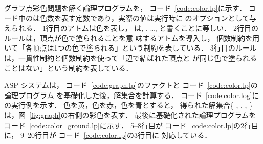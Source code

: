 グラフ点彩色問題を解く論理プログラムを，
コード~\ref{code:color.lp}に示す．
コード中のは色数を表す定数であり，実際の値は実行時に
{\clingo}のオプションとして与えられる．
1行目のアトムは色を表し，
は, , \ldots,
と書くことに等しい．
%
2行目のルールは，頂点が色で塗られることを意
味するアトムを導入し，
個数制約を用いて「各頂点は1つの色で塗られる」という制約を表している．
3行目のルールは，一貫性制約と個数制約を使って「辺で結ばれた頂点と
が同じ色で塗られることはない」という制約を表している．

ASP システムは，
コード~\ref{code:graph.lp}のファクトと
コード~\ref{code:color.lp}の論理プログラム
を基礎化した後，解集合を計算する．
コード~\ref{code:color.log}に{\clingo}の実行例を示す．
色を黄，色を赤，色を青とすると，
得られた解集合\{
,
,
,
\}
は，図~\ref{fig:graph}の右側の彩色を表す．
最後に基礎化された論理プログラムを
コード~\ref{code:color_ground.lp}に示す．
5--8行目が
コード~\ref{code:color.lp}の2行目に，
9--20行目が
コード~\ref{code:color.lp}の3行目に
対応している．

